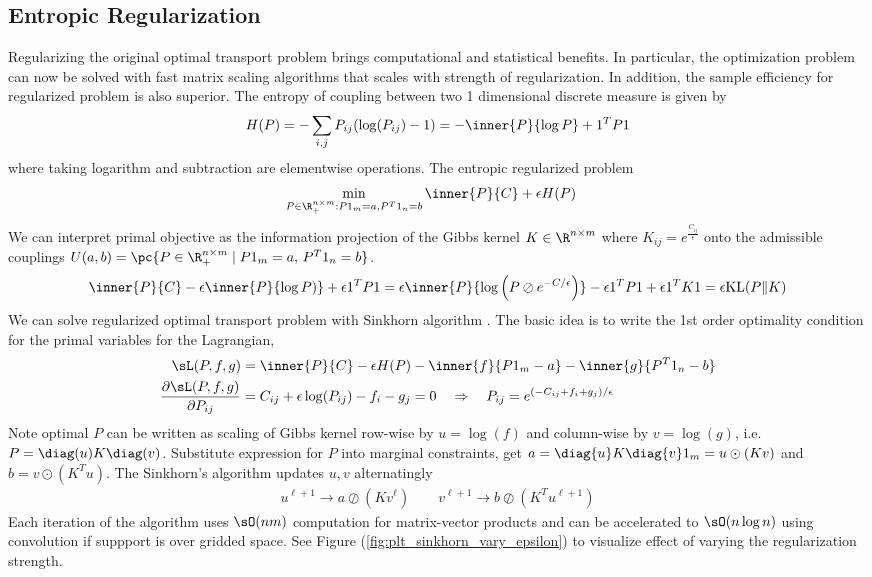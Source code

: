 \documentclass[11pt]{article}
\begin{document}
\subsection{Entropic Regularization}

Regularizing the original optimal transport problem brings computational and statistical benefits. In particular, the optimization problem can now be solved with fast matrix scaling algorithms that scales with strength of regularization. In addition, the sample efficiency for regularized problem is also superior. The entropy of coupling between two 1 dimensional discrete measure is given by
\begin{align}
    H(P)
        = -\sum_{i,j} P_{ij}(\log(P_{ij})-1)
        = - \inner{P}{\log P} + 1^TP1
\end{align}
where taking logarithm and subtraction are elementwise operations. The entropic regularized problem
\begin{align}
    \min_{P\in\R^{n\times m}_+:P1_m=a,P^T1_n=b}\,
        &\inner{P}{C} + \epsilon H(P)
\end{align}
We can interpret primal objective as the information projection of the Gibbs kernel $K\in\R^{n\times m}$ where $K_{ij}=e^{\frac{C_{ij}}{\epsilon}}$ onto the admissible couplings $U(a,b)=\pc{P\in\R^{n\times m}_+\mid P1_m=a,\, P^T1_n=b}$.
\begin{align}
    \inner{P}{C} - \epsilon\inner{P}{\log P)} + \epsilon 1^T P 1
        = \epsilon \inner{P}{\log\left(P \oslash e^{-C/\epsilon} \right)} - \epsilon 1^TP1 + \epsilon 1^TK1
        = \epsilon \text{KL}(P\Vert K)
\end{align}
We can solve regularized optimal transport problem with Sinkhorn algorithm \cite{cuturiSinkhornDistancesLightspeed2013}. The basic idea is to write the 1st order optimality condition for the primal variables for the Lagrangian,
\begin{align}
    \sL(P,f,g)
        &= \inner{P}{C} - \epsilon H(P) - \inner{f}{P1_m-a}- \inner{g}{P^T1_n-b} \\
    \frac{\partial \sL(P,f,g)}{\partial P_{ij}}
        &= C_{ij} + \epsilon \log(P_{ij}) - f_i - g_j = 0
        \quad\Rightarrow\quad
        P_{ij} = e^{(-C_{ij}+f_i+g_j)/\epsilon}
\end{align}
Note optimal $P$ can be written as scaling of Gibbs kernel row-wise by $u=\log(f)$ and column-wise by $v=\log(g)$, i.e. $P=\diag(u)K \diag(v)$. Substitute expression for $P$ into marginal constraints, get $a = \diag{u} K \diag{v} 1_m = u\odot (Kv)$ and $b = v\odot (K^T u)$. The Sinkhorn's algorithm updates $u,v$ alternatingly
\begin{align}
    u^{\ell+1} 
        \rightarrow a \oslash (Kv^{\ell}) 
    \quad\quad
    v^{\ell+1}
        \rightarrow b \oslash (K^Tu^{\ell+1})
\end{align}
Each iteration of the algorithm uses $\sO(nm)$ computation for matrix-vector products and can be accelerated to $\sO(n\log n)$ using convolution if suppport is over gridded space. See Figure (\ref{fig:plt_sinkhorn_vary_epsilon}) to visualize effect of varying the regularization strength.
\end{document}
